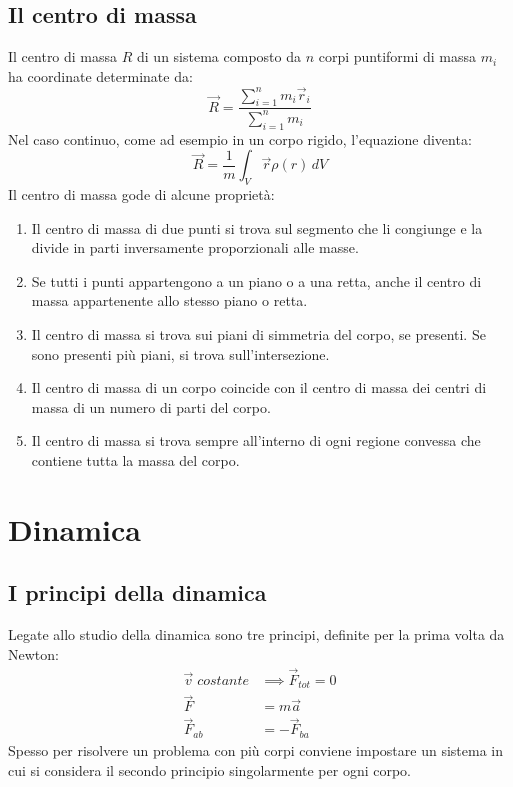 \documentclass{article}
\begin{document}
\subsection{Il centro di massa}
Il centro di massa $R$ di un sistema composto da $n$ corpi puntiformi di massa $m_i$ ha coordinate determinate da:
\begin{equation}
    \Vec{R}=\frac{\sum_{i=1}^n m_i \Vec{r}_i}{\sum_{i=1}^n m_i}
\end{equation}
Nel caso continuo, come ad esempio in un corpo rigido, l'equazione diventa:
\begin{equation}
    \Vec{R}=\frac{1}{m} \int_V \Vec{r} \rho(r) \, dV
\end{equation}
Il centro di massa gode di alcune proprietà:
\begin{enumerate}
    \item Il centro di massa di due punti si trova sul segmento che li congiunge e la divide in parti inversamente proporzionali alle masse.
    \item Se tutti i punti appartengono a un piano o a una retta, anche il centro di massa appartenente allo stesso piano o retta.
    \item Il centro di massa si trova sui piani di simmetria del corpo, se presenti. Se sono presenti più piani, si trova sull'intersezione.
    \item Il centro di massa di un corpo coincide con il centro di massa dei centri di massa di un numero di parti del corpo.
    \item Il centro di massa si trova sempre all'interno di ogni regione convessa che contiene tutta la massa del corpo.
\end{enumerate}


\section{Dinamica}

\subsection{I principi della dinamica}

Legate allo studio della dinamica sono tre principi, definite per la prima volta da Newton:
\begin{align}
    \vec{v} \; costante &\implies \Vec{F}_{tot}=0 \\
    \Vec{F}&=m\vec{a} \\
    \Vec{F}_{ab}&=-\Vec{F}_{ba} 
\end{align}
Spesso per risolvere un problema con più corpi conviene impostare un sistema in cui si considera il secondo principio singolarmente per ogni corpo.
\end{document}
